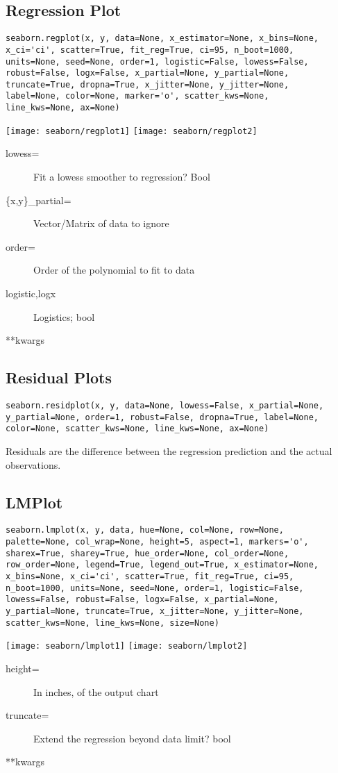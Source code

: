 \subsection{Regression Plot}
\begin{verbatim}
seaborn.regplot(x, y, data=None, x_estimator=None, x_bins=None, 
x_ci='ci', scatter=True, fit_reg=True, ci=95, n_boot=1000, 
units=None, seed=None, order=1, logistic=False, lowess=False, 
robust=False, logx=False, x_partial=None, y_partial=None, 
truncate=True, dropna=True, x_jitter=None, y_jitter=None, 
label=None, color=None, marker='o', scatter_kws=None, 
line_kws=None, ax=None)
\end{verbatim}
\texttt{[image: seaborn/regplot1]}
\texttt{[image: seaborn/regplot2]}
\begin{description}
	\item[lowess=] Fit a lowess smoother to regression? Bool
	\item[\{x,y\}\_partial=] Vector/Matrix of data to ignore
	\item[order=] Order of the polynomial to fit to data
	\item[logistic,logx] Logistics; bool
	\item[**kwargs] 
\end{description}

\subsection{Residual Plots}
\begin{verbatim}
seaborn.residplot(x, y, data=None, lowess=False, x_partial=None, 
y_partial=None, order=1, robust=False, dropna=True, label=None, 
color=None, scatter_kws=None, line_kws=None, ax=None)
\end{verbatim}
Residuals are the difference between the regression prediction and the actual observations.

\subsection{LMPlot}
\begin{verbatim}
seaborn.lmplot(x, y, data, hue=None, col=None, row=None, 
palette=None, col_wrap=None, height=5, aspect=1, markers='o', 
sharex=True, sharey=True, hue_order=None, col_order=None, 
row_order=None, legend=True, legend_out=True, x_estimator=None, x_bins=None, x_ci='ci', scatter=True, fit_reg=True, ci=95, 
n_boot=1000, units=None, seed=None, order=1, logistic=False, 
lowess=False, robust=False, logx=False, x_partial=None, 
y_partial=None, truncate=True, x_jitter=None, y_jitter=None, 
scatter_kws=None, line_kws=None, size=None)
\end{verbatim}
\texttt{[image: seaborn/lmplot1]}
\texttt{[image: seaborn/lmplot2]}
\begin{description}
	\item[height=] In inches, of the output chart
	\item[truncate=] Extend the regression beyond data limit? bool
	\item[**kwargs] 
\end{description}

